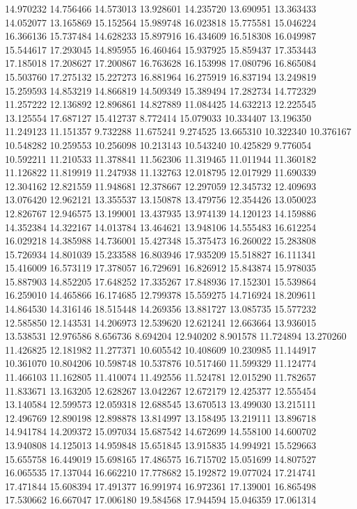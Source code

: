 14.970232
14.756466
14.573013
13.928601
14.235720
13.690951
13.363433
14.052077
13.165869
15.152564
15.989748
16.023818
15.775581
15.046224
16.366136
15.737484
14.628233
15.897916
16.434609
16.518308
16.049987
15.544617
17.293045
14.895955
16.460464
15.937925
15.859437
17.353443
17.185018
17.208627
17.200867
16.763628
16.153998
17.080796
16.865084
15.503760
17.275132
15.227273
16.881964
16.275919
16.837194
13.249819
15.259593
14.853219
14.866819
14.509349
15.389494
17.282734
14.772329
11.257222
12.136892
12.896861
14.827889
11.084425
14.632213
12.225545
13.125554
17.687127
15.412737
8.772414
15.079033
10.334407
13.196350
11.249123
11.151357
9.732288
11.675241
9.274525
13.665310
10.322340
10.376167
10.548282
10.259553
10.256098
10.213143
10.543240
10.425829
9.776054
10.592211
11.210533
11.378841
11.562306
11.319465
11.011944
11.360182
11.126822
11.819919
11.247938
11.132763
12.018795
12.017929
11.690339
12.304162
12.821559
11.948681
12.378667
12.297059
12.345732
12.409693
13.076420
12.962121
13.355537
13.150878
13.479756
12.354426
13.050023
12.826767
12.946575
13.199001
13.437935
13.974139
14.120123
14.159886
14.352384
14.322167
14.013784
13.464621
13.948106
14.555483
16.612254
16.029218
14.385988
14.736001
15.427348
15.375473
16.260022
15.283808
15.726934
14.801039
15.233588
16.803946
17.935209
15.518827
16.111341
15.416009
16.573119
17.378057
16.729691
16.826912
15.843874
15.978035
15.887903
14.852205
17.648252
17.335267
17.848936
17.152301
15.539864
16.259010
14.465866
16.174685
12.799378
15.559275
14.716924
18.209611
14.864530
14.316146
18.515448
14.269356
13.881727
13.085735
15.577232
12.585850
12.143531
14.206973
12.539620
12.621241
12.663664
13.936015
13.538531
12.976586
8.656736
8.694204
12.940202
8.901578
11.724894
13.270260
11.426825
12.181982
11.277371
10.605542
10.408609
10.230985
11.144917
10.361070
10.804206
10.598748
10.537876
10.517460
11.599329
11.124774
11.466103
11.162805
11.410074
11.492556
11.524781
12.015290
11.782657
11.833671
13.163205
12.628267
13.042267
12.672179
12.425377
12.555454
13.140584
12.599573
12.059318
12.688545
13.670513
13.499030
13.215111
12.496769
12.890198
12.898878
13.814997
13.158495
13.219111
13.896718
14.941784
14.209372
15.097034
15.687542
14.672699
14.558100
14.600702
13.940808
14.125013
14.959848
15.651845
13.915835
14.994921
15.529663
15.655758
16.449019
15.698165
17.486575
16.715702
15.051699
14.807527
16.065535
17.137044
16.662210
17.778682
15.192872
19.077024
17.214741
17.471844
15.608394
17.491377
16.991974
16.972361
17.139001
16.865498
17.530662
16.667047
17.006180
19.584568
17.944594
15.046359
17.061314
